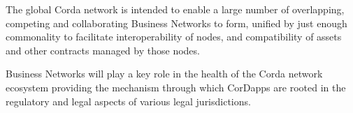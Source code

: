\documentclass{article}
\begin{document}
%


The global Corda network is intended to enable a large number of overlapping, competing and collaborating Business Networks to form, unified by just enough commonality to facilitate interoperability of nodes, and compatibility of assets and other contracts managed by those nodes.

Business Networks will play a key role in the health of the Corda network ecosystem providing the mechanism through which CorDapps are rooted in the regulatory and legal aspects of various legal jurisdictions.
\end{document}
